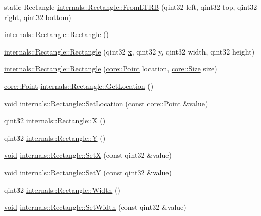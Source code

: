 \begin{DoxyCompactItemize}
\item 
static \-Rectangle \hyperlink{group___o_p_map_widget_gabe5c3b8c9edda8d902d997d47d9dc795}{internals\-::\-Rectangle\-::\-From\-L\-T\-R\-B} (qint32 left, qint32 top, qint32 right, qint32 bottom)
\item 
\hyperlink{group___o_p_map_widget_ga03611c46b536e7a99cbdbc186e3dff19}{internals\-::\-Rectangle\-::\-Rectangle} ()
\item 
\hyperlink{group___o_p_map_widget_ga4c4f49dc7eb25d83f3289fe29b2b4cd1}{internals\-::\-Rectangle\-::\-Rectangle} (qint32 \hyperlink{_o_p_plots_8m_a9336ebf25087d91c818ee6e9ec29f8c1}{x}, qint32 \hyperlink{_o_p_plots_8m_a2fb1c5cf58867b5bbc9a1b145a86f3a0}{y}, qint32 width, qint32 height)
\item 
\hyperlink{group___o_p_map_widget_ga1d494138f0b6c0ba9d64a3b5dd0e076c}{internals\-::\-Rectangle\-::\-Rectangle} (\hyperlink{structcore_1_1_point}{core\-::\-Point} location, \hyperlink{structcore_1_1_size}{core\-::\-Size} size)
\item 
\hyperlink{structcore_1_1_point}{core\-::\-Point} \hyperlink{group___o_p_map_widget_ga9dcbcbee1c0e91b3dfd3338a9a464d84}{internals\-::\-Rectangle\-::\-Get\-Location} ()
\item 
\hyperlink{group___u_a_v_objects_plugin_ga444cf2ff3f0ecbe028adce838d373f5c}{void} \hyperlink{group___o_p_map_widget_ga7d71ff294aa5fdf0878e8c79a8b07725}{internals\-::\-Rectangle\-::\-Set\-Location} (const \hyperlink{structcore_1_1_point}{core\-::\-Point} \&value)
\item 
qint32 \hyperlink{group___o_p_map_widget_ga95fc9b3e998dac5bc018066e5f59abf3}{internals\-::\-Rectangle\-::\-X} ()
\item 
qint32 \hyperlink{group___o_p_map_widget_ga6ca37907a3c1adef88ec18719e426391}{internals\-::\-Rectangle\-::\-Y} ()
\item 
\hyperlink{group___u_a_v_objects_plugin_ga444cf2ff3f0ecbe028adce838d373f5c}{void} \hyperlink{group___o_p_map_widget_ga22ba95479846a429af53aa19f149f5f3}{internals\-::\-Rectangle\-::\-Set\-X} (const qint32 \&value)
\item 
\hyperlink{group___u_a_v_objects_plugin_ga444cf2ff3f0ecbe028adce838d373f5c}{void} \hyperlink{group___o_p_map_widget_gaea8a51114d79ece5fb59532867e15328}{internals\-::\-Rectangle\-::\-Set\-Y} (const qint32 \&value)
\item 
qint32 \hyperlink{group___o_p_map_widget_ga1dcf3f71849a2534fe47d2db0fb5a317}{internals\-::\-Rectangle\-::\-Width} ()
\item 
\hyperlink{group___u_a_v_objects_plugin_ga444cf2ff3f0ecbe028adce838d373f5c}{void} \hyperlink{group___o_p_map_widget_gadf0be7cce382491567f5eceec5dbb0a2}{internals\-::\-Rectangle\-::\-Set\-Width} (const qint32 \&value)

\end{DoxyCompactItemize}

